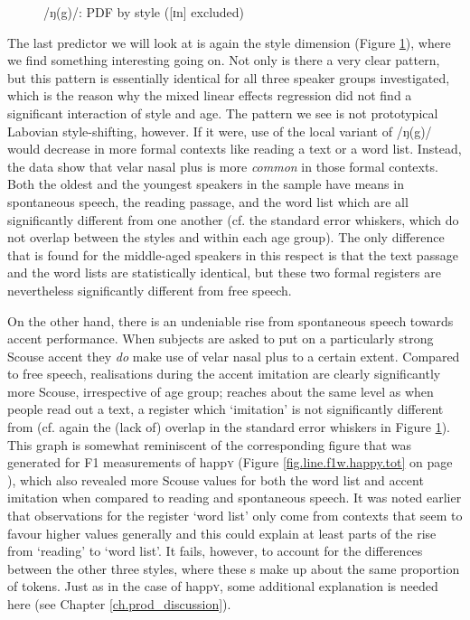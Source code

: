 \begin{figure}[h]
	\centering
		\resizebox{0.5\linewidth}{!}{} 
	\caption{/ŋ(g)/: PDF by style ([ɪn] excluded)}
	\label{fig.line.ng.tot}
\end{figure}

The last predictor we will look at is again the style dimension (Figure \ref{fig.line.ng.tot}), where we find something interesting going on.
Not only is there a very clear pattern, but this pattern is essentially identical for all three speaker groups investigated, which is the reason why the mixed linear effects regression did not find a significant interaction of style and age.
The pattern we see is not prototypical Labovian style-shifting, however.
If it were, use of the local variant of /ŋ(g)/ would decrease in more formal contexts like reading a text or a word list.
Instead, the data show that velar nasal plus is more \emph{common} in those formal contexts.
Both the oldest and the youngest speakers in the sample have means in spontaneous speech, the reading passage, and the word list which are all significantly different from one another (cf. the standard error whiskers, which do not overlap between the styles and within each age group).
The only difference that is found for the middle-aged speakers in this respect is that the text passage and the word lists are statistically identical, but these two formal registers are nevertheless significantly different from free speech.

On the other hand, there is an undeniable rise from spontaneous speech towards accent performance.
When subjects are asked to put on a particularly strong Scouse accent they \emph{do} make use of velar nasal plus to a certain extent.
Compared to free speech, realisations during the accent imitation are clearly significantly more Scouse, irrespective of age group;  reaches about the same level as when people read out a text, a register which `imitation' is not significantly different from (cf. again the (lack of) overlap in the standard error whiskers in Figure \ref{fig.line.ng.tot}).
This graph is somewhat reminiscent of the corresponding figure that was generated for F1 measurements of happ\textsc{y} (Figure \ref{fig.line.f1w.happy.tot} on page \pageref{fig.line.f1w.happy.tot}), which also revealed more Scouse values for both the word list and accent imitation when compared to reading and spontaneous speech.
It was noted earlier that observations for the register `word list' only come from contexts that seem to favour higher  values generally and this could explain at least parts of the rise from `reading' to `word list'.
It fails, however, to account for the differences between the other three styles, where these s make up about the same proportion of tokens.
Just as in the case of happ\textsc{y}, some additional explanation is needed here (see Chapter \ref{ch.prod_discussion}).

